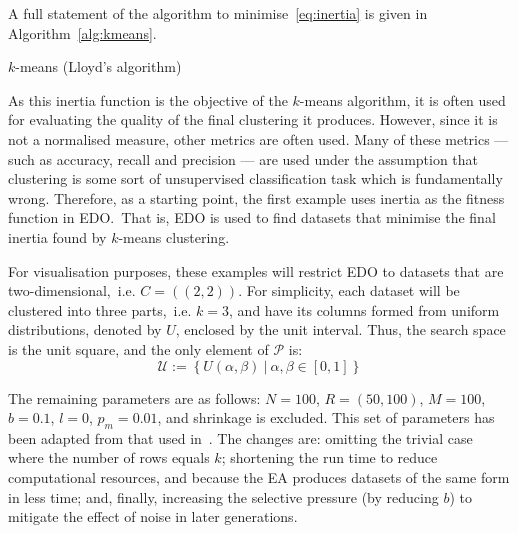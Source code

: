 A full statement of the algorithm to minimise~\eqref{eq:inertia} is given in
Algorithm~\ref{alg:kmeans}.

\balg%

\caption{\(k\)-means (Lloyd's algorithm)}\label{alg:kmeans}
\ealg%

As this inertia function is the objective of the \(k\)-means algorithm, it is
often used for evaluating the quality of the final clustering it produces.
However, since it is not a normalised measure, other metrics are often used.
Many of these metrics --- such as accuracy, recall and precision --- are used
under the assumption that clustering is some sort of unsupervised classification
task which is fundamentally wrong. Therefore, as a starting point, the first
example uses inertia as the fitness function in EDO.\ That is, EDO is used to
find datasets that minimise the final inertia found by \(k\)-means clustering.


For visualisation purposes, these examples will restrict EDO to datasets that
are two-dimensional,~i.e. \(C = ((2, 2))\). For simplicity, each dataset
will be clustered into three parts,~i.e. \(k = 3\), and have its columns formed
from uniform distributions, denoted by \(U\), enclosed by the unit interval.
Thus, the search space is the unit square, and the only element of
\(\mathcal{P}\) is:
\begin{equation}\label{eq:uniform}
    \mathcal{U} := \left\{U(\alpha, \beta)~|~\alpha, \beta \in [0, 1]\right\}
\end{equation}

The remaining parameters are as follows: \(N=100\), \(R=(50,100)\), \(M=100\),
\(b=0.1\), \(l=0\), \(p_m=0.01\), and shrinkage is excluded. This set of
parameters has been adapted from that used in~\cite{Wilde2020:edo}. The changes
are: omitting the trivial case where the number of rows equals \(k\); shortening
the run time to reduce computational resources, and because the EA produces
datasets of the same form in less time; and, finally, increasing the selective
pressure (by reducing \(b\)) to mitigate the effect of noise in later
generations.

